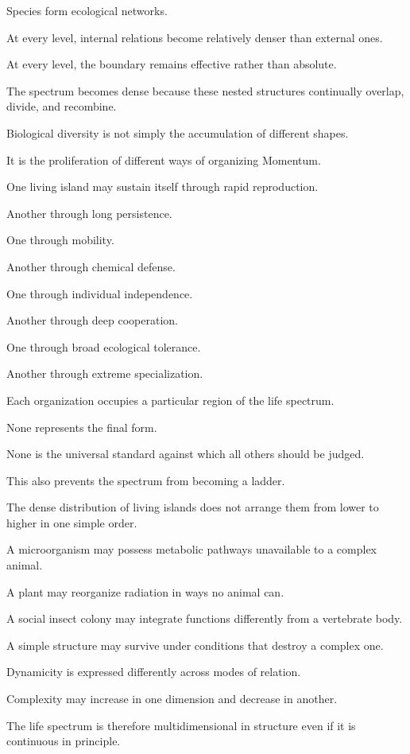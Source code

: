 Species form ecological networks.

At every level, internal relations become relatively denser than external ones.

At every level, the boundary remains effective rather than absolute.

The spectrum becomes dense because these nested structures continually overlap, divide, and recombine.

Biological diversity is not simply the accumulation of different shapes.

It is the proliferation of different ways of organizing Momentum.

One living island may sustain itself through rapid reproduction.

Another through long persistence.

One through mobility.

Another through chemical defense.

One through individual independence.

Another through deep cooperation.

One through broad ecological tolerance.

Another through extreme specialization.

Each organization occupies a particular region of the life spectrum.

None represents the final form.

None is the universal standard against which all others should be judged.

This also prevents the spectrum from becoming a ladder.

The dense distribution of living islands does not arrange them from lower to higher in one simple order.

A microorganism may possess metabolic pathways unavailable to a complex animal.

A plant may reorganize radiation in ways no animal can.

A social insect colony may integrate functions differently from a vertebrate body.

A simple structure may survive under conditions that destroy a complex one.

Dynamicity is expressed differently across modes of relation.

Complexity may increase in one dimension and decrease in another.

The life spectrum is therefore multidimensional in structure even if it is continuous in principle.

